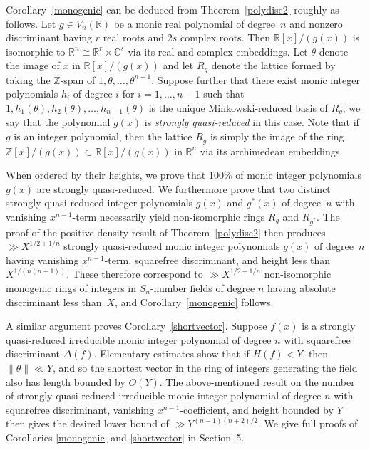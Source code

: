 \documentclass[11pt]{article}
\def\Z{{\mathbb Z}}
\def\R{{\mathbb R}}
\def\C{{\mathcal C}}
\def\Vmn{{V_n}}
\def\Z{{\mathbb Z}}
\def\C{{\mathbb C}}
\begin{document}
Corollary~\ref{monogenic} can be deduced from
Theorem~\ref{polydisc2} roughly as follows. Let $g\in \Vmn(\R)$ be
a monic real polynomial of degree~$n$ and nonzero discriminant having
$r$ real roots and $2s$ complex roots.  Then $\R[x]/(g(x))$ is
isomorphic to $\R^n\cong \R^r\times \C^s$ via its real and complex
embeddings.  Let $\theta$ denote the image of $x$ in $\R[x]/(g(x))$
and let $R_g$ denote the lattice formed by taking the $\Z$-span of
$1,\theta,\ldots,\theta^{n-1}$. Suppose further that there exist
monic integer polynomials $h_i$ of degree $i$ for $i=1,\ldots,n-1$
such that $1,h_1(\theta),h_2(\theta),\ldots,h_{n-1}(\theta)$ is the
unique Minkowski-reduced basis of $R_g$; we say that the polynomial
$g(x)$ is {\it strongly quasi-reduced} in this case. Note that if $g$
is an integer polynomial, then the lattice $R_g$ is simply the image
of the ring $\Z[x]/(g(x))\subset \R[x]/(g(x))$ in $\R^n$ via its
archimedean embeddings.

  When ordered by their heights, we prove that 100\% of monic integer
  polynomials $g(x)$ are strongly quasi-reduced. We furthermore prove
  that two distinct strongly quasi-reduced integer polynomials $g(x)$
  and $g^\ast(x)$ of degree~$n$ with vanishing $x^{n-1}$-term
  necessarily yield non-isomorphic rings $R_g$ and $R_{g^\ast}$.  The
  proof of the positive density result of Theorem~\ref{polydisc2} then
  produces $\gg X^{1/2+1/n}$ strongly quasi-reduced monic integer
  polynomials $g(x)$ of degree~$n$ having vanishing $x^{n-1}$-term,
  squarefree discriminant, and height less than $X^{1/(n(n-1))}$.
  These therefore correspond to $\gg X^{1/2+1/n}$ non-isomorphic
  monogenic rings of integers in $S_n$-number fields of degree $n$
  having absolute discriminant less than~$X$, and
  Corollary~\ref{monogenic} follows.

A similar argument proves Corollary~\ref{shortvector}. Suppose $f(x)$
is a strongly quasi-reduced irreducible monic integer polynomial of
degree $n$ with squarefree discriminant $\Delta(f)$.  Elementary
estimates show that if $H(f)<Y$, then $\|\theta\|\ll Y$, and so the
shortest vector in the ring of integers generating the field also has
length bounded by $O(Y)$. The above-mentioned result on the number of
strongly quasi-reduced irreducible monic integer polynomial of degree
$n$ with squarefree discriminant, vanishing $x^{n-1}$-coefficient, and
height bounded by $Y$ then gives the desired lower bound of
$\gg Y^{(n-1)(n+2)/2}.$ We give full proofs of Corollaries \ref{monogenic} and
\ref{shortvector} in Section~5.
\end{document}
